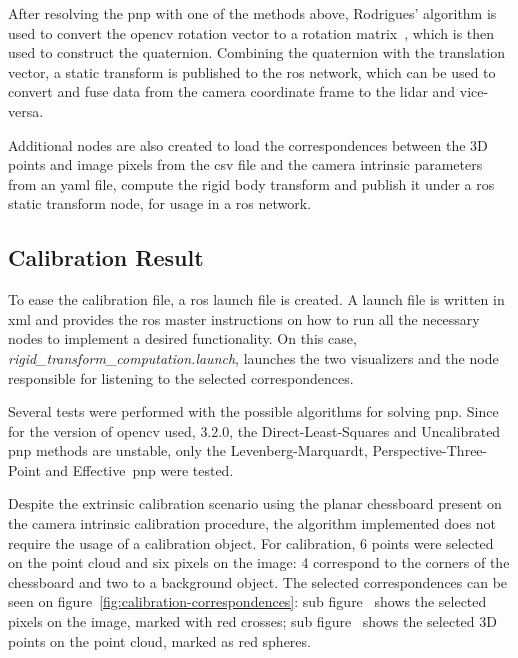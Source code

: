 After resolving the \ac{pnp} with one of the methods above, Rodrigues' algorithm is used to convert the \ac{opencv} rotation vector to a rotation matrix~\cite{Dai2015}, which is then used to construct the quaternion. Combining the quaternion with the translation vector, a static transform is published to the \ac{ros} network, which can be used to convert and fuse data from the camera coordinate frame to the \ac{lidar} and vice-versa.

Additional nodes are also created to load the correspondences between the 3D points and image pixels from the \ac{csv} file and the camera intrinsic parameters from an \ac{yaml} file, compute the rigid body transform and publish it under a \ac{ros} static transform node, for usage in a \ac{ros} network.


\subsection{Calibration Result}
To ease the calibration file, a \ac{ros} launch file is created. A launch file is written in \ac{xml} and provides the  \ac{ros} master instructions on how to run all the necessary nodes to implement a desired functionality. On this case, \emph{rigid\_transform\_computation.launch}, launches the two visualizers and the node responsible for listening to the selected correspondences. 

Several tests were performed with the possible algorithms for solving \ac{pnp}. Since for the version of \ac{opencv} used, $3.2.0$, the Direct-Least-Squares and Uncalibrated \ac{pnp} methods are unstable\cite{opencv_doc}, only the Levenberg-Marquardt, Perspective-Three-Point and Effective~\ac{pnp} were tested. 

Despite the extrinsic calibration scenario using the planar chessboard present on the camera intrinsic calibration procedure, the algorithm implemented does not require the usage of a calibration object. For calibration, 6 points were selected on the point cloud and six pixels on the image: 4 correspond to the corners of the chessboard and two to a background object. The selected correspondences can be seen on figure~\ref{fig:calibration-correspondences}: sub figure~ shows the selected pixels on the image, marked with red crosses; sub figure~ shows the selected 3D points on the point cloud, marked as red spheres.


